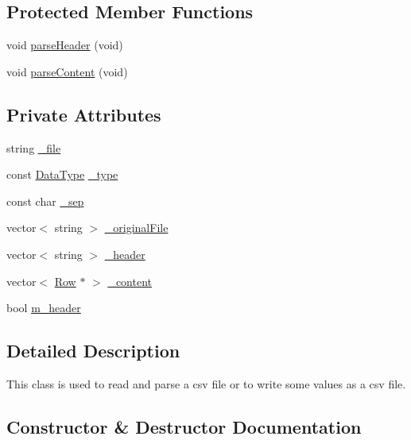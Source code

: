 \subsection*{Protected Member Functions}
\begin{DoxyCompactItemize}
\item 
void \mbox{\hyperlink{class_c_s_v_parser_a8b556e47ecfea188d4c6c630616f5667}{parse\+Header}} (void)
\item 
void \mbox{\hyperlink{class_c_s_v_parser_aa403f7d8238903aa0e046a9a091ab968}{parse\+Content}} (void)
\end{DoxyCompactItemize}
\subsection*{Private Attributes}
\begin{DoxyCompactItemize}
\item 
string \mbox{\hyperlink{class_c_s_v_parser_a1db17c9285f8fdcaed2499747582e4a9}{\+\_\+file}}
\item 
const \mbox{\hyperlink{_c_s_vparser_8hpp_ad8ed01ff3ff33333d8e19db4d2818bb6}{Data\+Type}} \mbox{\hyperlink{class_c_s_v_parser_a27cff8e618160b2685f1e05b8a7da9cf}{\+\_\+type}}
\item 
const char \mbox{\hyperlink{class_c_s_v_parser_a9d778da8bd668d2393d4402ce7eae9cd}{\+\_\+sep}}
\item 
vector$<$ string $>$ \mbox{\hyperlink{class_c_s_v_parser_afa0c154dd897b5ddcbf8364a9df28eeb}{\+\_\+original\+File}}
\item 
vector$<$ string $>$ \mbox{\hyperlink{class_c_s_v_parser_a9b35b0a143febb8fb388769417fa0777}{\+\_\+header}}
\item 
vector$<$ \mbox{\hyperlink{class_row}{Row}} $\ast$ $>$ \mbox{\hyperlink{class_c_s_v_parser_adff6872f7e93cbc10797bac6173671d4}{\+\_\+content}}
\item 
bool \mbox{\hyperlink{class_c_s_v_parser_a4dcb7bb113b65d0abf816dd899395545}{m\+\_\+header}}
\end{DoxyCompactItemize}


\subsection{Detailed Description}
This class is used to read and parse a csv file or to write some values as a csv file. 

\subsection{Constructor \& Destructor Documentation}
\mbox{\label{class_c_s_v_parser_aba4d9ee88285f39766e7cc810f46d9d9}} 
